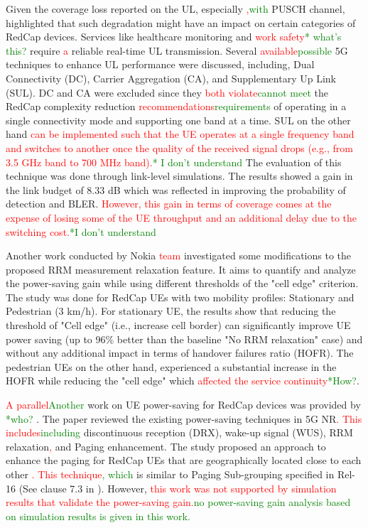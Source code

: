 \documentclass[]{IEEEtran}
\newcommand{\CAREPL}[2]{\textcolor{red}{#1}\textcolor{green}{#2}}
\begin{document}
Given the coverage loss reported on the UL, especially \CAREPL{,}{with} PUSCH channel, \cite{saafi_enhancing_2022} highlighted that such degradation might have an impact on certain categories of RedCap devices. 
Services like healthcare monitoring and \CAREPL{work safety}{* what's this?} require \CAREPL{a}{} reliable real-time UL transmission. Several \CAREPL{available}{possible} 5G techniques to enhance UL performance were discussed, including, Dual Connectivity (DC), Carrier Aggregation (CA), and Supplementary Up Link (SUL). 
DC and CA were excluded since they \CAREPL{both violate}{cannot meet} the RedCap complexity reduction \CAREPL{recommendations}{requirements} of operating in a single connectivity mode and supporting one band at a time. 
SUL on the other hand \CAREPL{can be implemented such that the UE operates at a single frequency band and switches to another once the quality of the received signal drops (e.g., from 3.5 GHz band to 700 MHz band).}{* I don't understand} 
The evaluation of this technique was done through link-level simulations. The results showed a gain in the link budget of 8.33 dB which was reflected in improving the probability of detection and BLER. 
\CAREPL{However, this gain in terms of coverage comes at the expense of losing some of the UE throughput and an additional delay due to the switching cost.}{*I don't understand}

Another work conducted by Nokia \CAREPL{team}{} \cite{tayyab_energy_2022} investigated some modifications to the proposed RRM measurement relaxation feature. 
It aims to quantify and analyze the power-saving gain while using different thresholds of the "cell edge" criterion. 
The study was done for RedCap UEs with two mobility profiles: Stationary and Pedestrian (3 km/h). For stationary UE, the results show that reducing the threshold of "Cell edge" (i.e., increase cell border) can significantly improve UE power saving (up to 96\% better than the baseline "No RRM relaxation" case) and without any additional impact in terms of handover failures ratio (HOFR). 
The pedestrian UEs on the other hand, experienced a substantial increase in the HOFR while reducing the "cell edge" which \CAREPL{affected the service continuity}{*How?}.

\CAREPL{A parallel}{Another} work on UE power-saving for RedCap devices was provided by \CAREPL{}{*who?} \cite{li_radio_2022}. 
The paper reviewed the existing power-saving techniques in 5G NR\CAREPL{. This includes}{including} discontinuous reception (DRX), wake-up signal (WUS), RRM relaxation\CAREPL{,}{} and Paging enhancement. 
The study proposed an approach to enhance the paging for RedCap UEs that are geographically located close to each other \CAREPL{. This technique}{, which} is similar to Paging Sub-grouping specified in Rel-16 (See clause 7.3 in \cite{3gpp_study_nodate-4_38.804}). However, \CAREPL{this work was not supported by simulation results that validate the power-saving gain.}{no power-saving gain analysis based on simulation results is given in this work.}   
\end{document}
